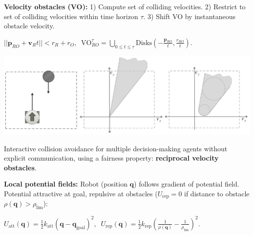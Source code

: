 \documentclass[landscape]{article}
\newcommand{\vmspace}{\vspace{-7pt}}
\newcommand{\vpspace}{\vspace{5pt}}
\begin{document}
\begin{multicols}{3}
\begin{minipage}{\columnwidth}
  \textbf{Velocity obstacles (VO):} 1) Compute set of colliding velocities. 2)
  Restrict to set of colliding velocities within time horizon $\tau$. 3) Shift
  VO by instantaneous obstacle velocity.
  \vmspace
  \begin{center}
    $
    || \mathbf p_{RO} + \mathbf v_R t || < r_R + r_O,\;\;
    \mathrm{VO}_{RO}^\tau = \bigcup\limits_{0 \le t \le \tau}
    \mathrm{Disks}\left(-\frac{\mathbf p_{RO}}{t}, \frac{r_{RO}}{t}\right).
    $
  \end{center}
  \vspace{-18pt}
  \includegraphics[width=\columnwidth]{img/12_VelocityObstacles.png}
\end{minipage}

\vpspace

\begin{minipage}{\columnwidth}
  Interactive collision avoidance for multiple decision-making agents without
  explicit communication, using a fairness property: \textbf{reciprocal velocity
  obstacles}.
\end{minipage}

\vpspace

\begin{minipage}{\columnwidth}
  \textbf{Local potential fields:} Robot (position $\mathbf q$) follows gradient
  of potential field. Potential attractive at goal, repulsive at obstacles
  ($U_\mathrm{rep} = 0$ if distance to obstacle $\rho(\mathbf q) >
  \rho_\mathrm{lim}$):
  \vmspace
  \begin{center}
    $
    U_\mathrm{att}(\mathbf q)
    =
    \frac{1}{2} k_\mathrm{att}(\mathbf q - \mathbf q_\mathrm{goal})^2,\;\;
    U_\mathrm{rep}(\mathbf q)
    =
    \frac{1}{2} k_\mathrm{rep} (\frac{1}{\rho(\mathbf q)}
    - \frac{1}{\rho_\mathrm{lim}})^2
    .
    $
  \end{center}
\end{minipage}

\vpspace


\end{multicols}
\end{document}
